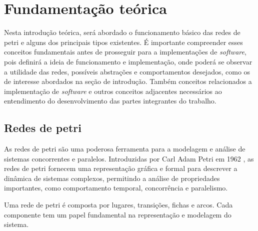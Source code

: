 \chapter{Fundamentação teórica}

Nesta introdução teórica, será abordado o funcionamento básico das redes de petri e alguns dos principais tipos existentes. É importante compreender esses conceitos fundamentais antes de prosseguir para a implementações de \textit{software}, pois definirá a ideia de funcionamento e implementação, onde poderá se observar a utilidade das redes, possíveis abstrações e comportamentos desejados, como os de interesse abordados na seção de introdução. Também conceitos relacionados a implementação de \textit{software} e outros conceitos adjacentes necessários ao entendimento do desenvolvimento das partes integrantes do trabalho.

\section{Redes de petri}

As redes de petri são uma poderosa ferramenta para a modelagem e análise de sistemas concorrentes e paralelos. Introduzidas por Carl Adam Petri em 1962 \cite{carlpetri}, as redes de petri fornecem uma representação gráfica e formal para descrever a dinâmica de sistemas complexos, permitindo a análise de propriedades importantes, como comportamento temporal, concorrência e paralelismo.

Uma rede de petri é composta por lugares, transições, fichas e arcos. Cada componente tem um papel fundamental na representação e modelagem do sistema.

